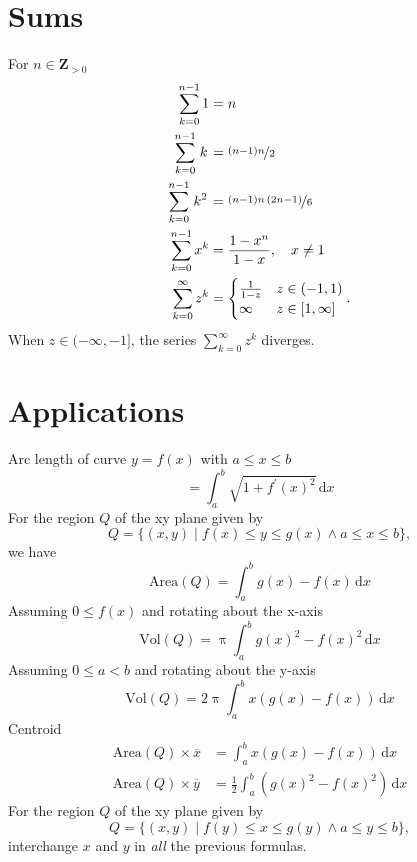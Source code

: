 \documentclass[letterpaper,landscape,9pt,fleqn]{extarticle}
\begin{document}
\begin{multicols*}{4}
\section*{Sums}
\begin{minipage}{0.25\textwidth}
For \(n\in \mathbf{Z}_{>0}\) 
\begin{align*}
    \sum_{k=0}^{n-1}1 &= n \\
     \sum_{k=0}^{n-1}{\left. k\right.} &=\nicefrac{\left( n-1\right)  n}{2}\\
    \sum_{k=0}^{n-1}{\left. {{k}^{2}}\right.} &=\nicefrac{\left( n-1\right)  n\, \left( 2 n-1\right) }{6}\\
    \sum_{k=0}^{n-1} x^k &= \frac{1-x^n}{1-x}, \quad  x \neq 1 \\
    \sum_{k=0}^\infty z^k &= \begin{cases} \frac{1}{1-z} & z \in (-1,1) \\
                                      \infty & z \in [1,\infty] 
\end{cases}.
   \end{align*}
   When $z \in (-\infty, -1]$, the series $\sum_{k=0}^\infty z^k$ diverges.
 \end{minipage}
 \vspace{0.25in}
 \section*{Applications}
Arc length of curve \(y = f(x)\) with \(a \leq x \leq b\)
\[
   = \int_a^b \sqrt{1 + f^\prime(x)^2} \, \mathrm{d} x
\]
For the region \(Q\) of the xy plane given by
\[
   Q = \{(x,y) \mid f(x) \leq y \leq g(x) \land a \leq x \leq b \},
\]
we have
\[
  \mbox{Area}(Q) = \int_a^b g(x) - f(x) \, \mathrm{d} x
\]  
Assuming \(0 \leq f(x)\) and rotating about the \mbox{x-axis}
\[
  \mbox{Vol}(Q) = \uppi \int_a^b g(x)^2 - f(x)^2 \, \mathrm{d} x
\]
Assuming \(0 \leq a < b\) and rotating about the y-axis
\[
  \mbox{Vol}(Q) = 2 \uppi \int_a^b x (g(x)  - f(x)) \, \mathrm{d} x
\]
Centroid
\begin{align*}
    \mbox{Area}(Q) \times \overline{x} &=  \int_a^b x \left(g(x) - f(x) \right) \, \mathrm{d} x \\
     \mbox{Area}(Q) \times \overline{y} &=  \frac{1}{2} \int_a^b  \left (g(x)^2  - f(x)^2 \right) \, \mathrm{d} x
\end{align*}
For the region \(Q\) of the xy plane given by
\[
   Q = \{(x,y) \mid f(y) \leq x \leq g(y) \land a \leq y \leq b \},
\]
interchange \(x\) and \(y\) in \emph{all} the previous formulas. 




\end{multicols*}
\end{document}
